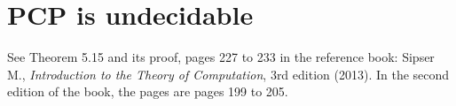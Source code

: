 \section{PCP is undecidable}
See Theorem 5.15 and its proof, pages 227 to 233
in the reference book: Sipser M.,
\emph{Introduction to the Theory of Computation}, 3rd edition
(2013).
In the second edition of the book, the pages are pages 199 to 205.
